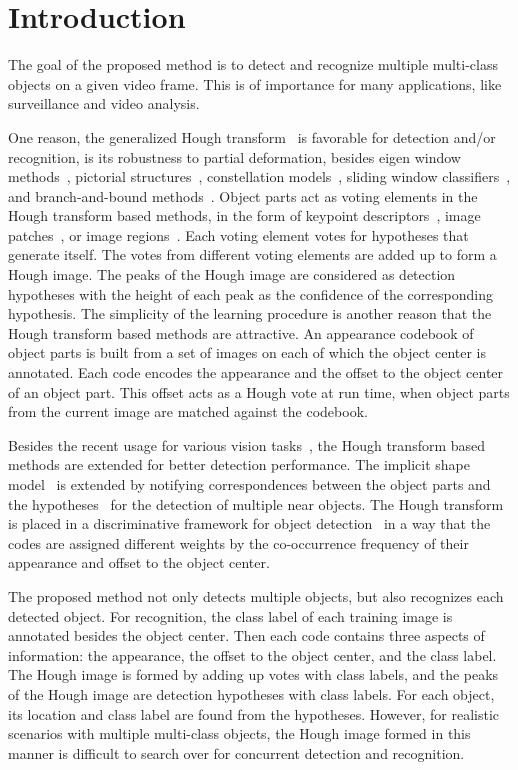 \documentclass[10pt,twocolumn,letterpaper]{article}
\begin{document}
\section{Introduction}

The goal of the proposed method is to detect and recognize multiple multi-class objects on a given video frame. This is of importance for many applications, like surveillance and video analysis.

One reason, the generalized Hough transform~\cite{ac17} is favorable for detection and{\slash}or recognition, is its robustness to partial deformation, besides eigen window methods~\cite{ac18}, pictorial structures~\cite{ac2}, constellation models~\cite{ac3}, sliding window classifiers~\cite{ac4,ac1}, and branch-and-bound methods~\cite{ac1}. Object parts act as voting elements in the Hough transform based methods, in the form of keypoint descriptors~\cite{lb1}, image patches~\cite{ac6,ac7}, or image regions~\cite{ac8}. Each voting element votes for hypotheses that generate itself. The votes from different voting elements are added up to form a Hough image. The peaks of the Hough image are considered as detection hypotheses with the height of each peak as the confidence of the corresponding hypothesis. The simplicity of the learning procedure is another reason that the Hough transform based methods are attractive. An appearance codebook of object parts is built from a set of images on each of which the object center is annotated. Each code encodes the appearance and the offset to the object center of an object part. This offset acts as a Hough vote at run time, when object parts from the current image are matched against the codebook.

Besides the recent usage for various vision tasks~\cite{ac10,ac14,ac15,ac16}, the Hough transform based methods are extended for better detection performance. The implicit shape model~\cite{lb1,ac5} is extended  by notifying correspondences between the object parts and the hypotheses~\cite{ac9} for the detection of multiple near objects. The Hough transform is placed in a discriminative framework for object detection~\cite{ac10} in a way that the codes are assigned different weights by the co-occurrence frequency of their appearance and offset to the object center.

The proposed method not only detects multiple objects, but also recognizes each detected object. For recognition, the class label of each training image is annotated besides the object center. Then each code contains three aspects of information: the appearance, the offset to the object center, and the class label. The Hough image is formed by adding up votes with class labels, and the peaks of the Hough image are detection hypotheses with class labels. For each object, its location and class label are found from the hypotheses. However, for realistic scenarios with multiple multi-class objects, the Hough image formed in this manner is difficult to search over for concurrent detection and recognition.
\end{document}
